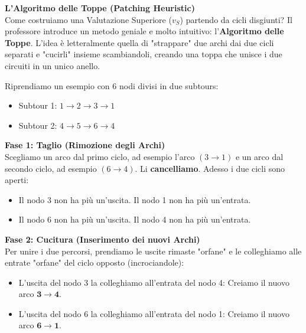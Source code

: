 \documentclass[12pt, a4paper]{article}
\newcommand{\separatore}{\noindent{\color{titlecolor!50}\rule{\textwidth}{0.6pt}}}
\begin{document}
	\vspace{0.6cm}
	\separatore
	\vspace{0.4cm}
	
	\textbf{L'Algoritmo delle Toppe (Patching Heuristic)}\\
	Come costruiamo una Valutazione Superiore ($v_S$) partendo da cicli disgiunti? Il professore introduce un metodo geniale e molto intuitivo: l'\textbf{Algoritmo delle Toppe}.
	L'idea è letteralmente quella di "strappare" due archi dai due cicli separati e "cucirli" insieme scambiandoli, creando una toppa che unisce i due circuiti in un unico anello.
	
	Riprendiamo un esempio con 6 nodi divisi in due subtours:
	\begin{itemize}[label=$\circ$, itemsep=2pt, leftmargin=1.5cm]
		\item Subtour 1: $1 \rightarrow 2 \rightarrow 3 \rightarrow 1$
		\item Subtour 2: $4 \rightarrow 5 \rightarrow 6 \rightarrow 4$
	\end{itemize}
	
	\textbf{Fase 1: Taglio (Rimozione degli Archi)}\\
	Scegliamo un arco dal primo ciclo, ad esempio l'arco $(3 \rightarrow 1)$ e un arco dal secondo ciclo, ad esempio $(6 \rightarrow 4)$. Li \textbf{cancelliamo}.
	Adesso i due cicli sono aperti:
	\begin{itemize}[label=$\circ$, itemsep=2pt, leftmargin=1.5cm]
		\item Il nodo 3 non ha più un'uscita. Il nodo 1 non ha più un'entrata.
		\item Il nodo 6 non ha più un'uscita. Il nodo 4 non ha più un'entrata.
	\end{itemize}
	
	\textbf{Fase 2: Cucitura (Inserimento dei nuovi Archi)}\\
	Per unire i due percorsi, prendiamo le uscite rimaste "orfane" e le colleghiamo alle entrate "orfane" del ciclo opposto (incrociandole):
	\begin{itemize}[label=$\circ$, itemsep=2pt, leftmargin=1.5cm]
		\item L'uscita del nodo 3 la colleghiamo all'entrata del nodo 4: Creiamo il nuovo arco $\mathbf{3 \rightarrow 4}$.
		\item L'uscita del nodo 6 la colleghiamo all'entrata del nodo 1: Creiamo il nuovo arco $\mathbf{6 \rightarrow 1}$.
	\end{itemize}
	
\end{document}
